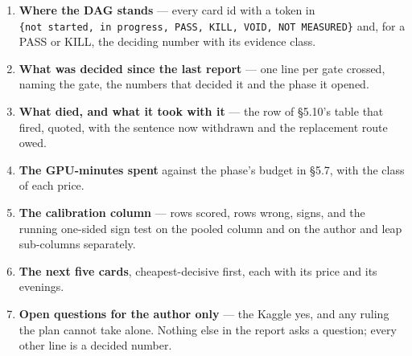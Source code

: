 \documentclass[11pt,a4paper]{article}
\theoremstyle{plain}
\theoremstyle{definition}
\theoremstyle{remark}
\providecommand{\tightlist}{%
  \setlength{\itemsep}{0pt}\setlength{\parskip}{0pt}}
\begin{document}
\begin{enumerate}
\def\labelenumi{\arabic{enumi}.}
\tightlist
\item
  \textbf{Where the DAG stands} --- every card id with a token in
  \texttt{\{not\ started,\ in\ progress,\ PASS,\ KILL,\ VOID,\ NOT\ MEASURED\}}
  and, for a PASS or KILL, the deciding number with its evidence class.
\item
  \textbf{What was decided since the last report} --- one line per gate
  crossed, naming the gate, the numbers that decided it and the phase it
  opened.
\item
  \textbf{What died, and what it took with it} --- the row of §5.10's
  table that fired, quoted, with the sentence now withdrawn and the
  replacement route owed.
\item
  \textbf{The GPU-minutes spent} against the phase's budget in §5.7,
  with the class of each price.
\item
  \textbf{The calibration column} --- rows scored, rows wrong, signs,
  and the running one-sided sign test on the pooled column and on the
  author and leap sub-columns separately.
\item
  \textbf{The next five cards}, cheapest-decisive first, each with its
  price and its evenings.
\item
  \textbf{Open questions for the author only} --- the Kaggle yes, and
  any ruling the plan cannot take alone. Nothing else in the report asks
  a question; every other line is a decided number.
\end{enumerate}
\end{document}
